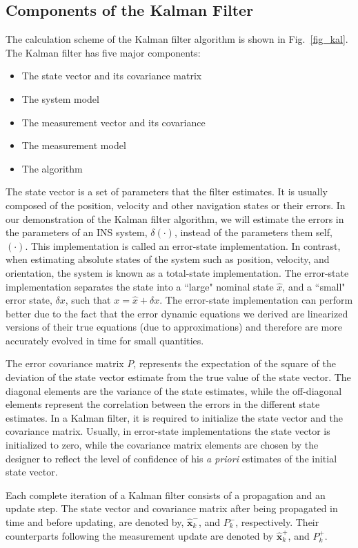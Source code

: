 \documentclass[journal]{IEEEtran}
\begin{document}
\subsection{Components of the Kalman Filter}
The calculation scheme of the Kalman filter  algorithm is shown in Fig.~\ref{fig_kal}.
The Kalman filter has five major components:
\begin{itemize}
	\item The state vector and its covariance matrix
    \item The system model
     \item The measurement vector and its covariance
     \item The measurement model
     \item The algorithm
\end{itemize}
The state vector is a set of parameters that the filter estimates. It is usually composed of the position, velocity and other navigation states or their errors. In our demonstration of the Kalman filter algorithm, we will estimate the errors in the parameters of an INS system, $\delta(\cdot)$, instead of the parameters them self, $(\cdot)$. This implementation is called an error-state implementation. In contrast, when estimating absolute states of the system such as position, velocity, and orientation, the system is known as a total-state implementation. The error-state implementation separates the state into a ``large" nominal state $\hat{x}$, and a ``small" error state, $\delta x$, such that $x=\hat{x}+\delta x$. The error-state implementation can perform better due to the fact that the error dynamic equations we derived are linearized versions of their true equations (due to approximations) and therefore are more accurately evolved in time for small quantities. 

The error covariance matrix $P$, represents the expectation of the square of the deviation of the state vector estimate from the true value of the state vector. The diagonal elements are the variance of the state estimates, while the off-diagonal elements represent the correlation between the errors in the different state estimates. In a Kalman filter, it is required to initialize the state vector and the covariance matrix. Usually, in error-state implementations the state vector is initialized to zero, while the covariance matrix elements are chosen by the designer to reflect the level of confidence of his \emph{a priori} estimates of the initial state vector. 

Each complete iteration of a Kalman filter consists of a propagation and an update step. The state vector and covariance matrix after being propagated in time and before updating, are denoted by, $\hat{\boldsymbol{x}}_k^-$, and $P_k^-$, respectively. Their counterparts following  the measurement update are denoted by $\hat{\boldsymbol{x}}_k^+$, and $P_k^+$.
\end{document}
